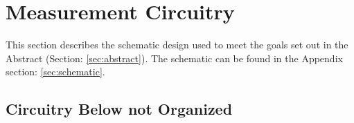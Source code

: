 \section {Measurement Circuitry}
This section describes the schematic design used to meet the goals set out in the Abstract (Section: \ref{sec:abstract}). The schematic can be found in the Appendix section: \ref{sec:schematic}.






\subsection{Circuitry Below not Organized}

